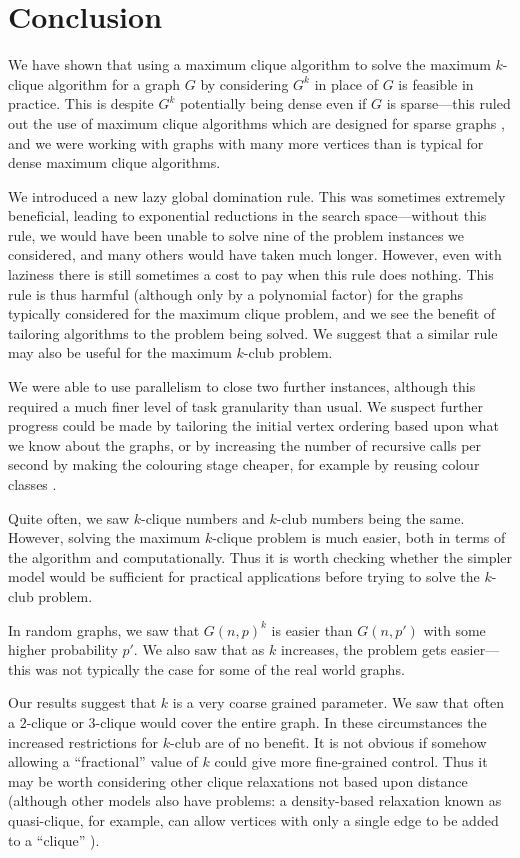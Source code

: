 \documentclass[letterpaper]{article}
\begin{document}
\section{Conclusion}

We have shown that using a maximum clique algorithm to solve the maximum $k$-clique algorithm for a
graph $G$ by considering $G^k$ in place of $G$ is feasible in practice. This is despite $G^k$
potentially being dense even if $G$ is sparse---this ruled out the use of maximum clique algorithms
which are designed for sparse graphs
\cite{DBLP:conf/waw/PattabiramanPGLC13,DBLP:journals/cor/SegundoLP16}, and we were working with
graphs with many more vertices than is typical for dense maximum clique algorithms.

We introduced a new lazy global domination rule. This was sometimes extremely beneficial, leading to
exponential reductions in the search space---without this rule, we would have been unable to solve
nine of the problem instances we considered, and many others would have taken much longer. However,
even with laziness there is still sometimes a cost to pay when this rule does nothing. This rule is
thus harmful (although only by a polynomial factor) for the graphs typically considered for the
maximum clique problem, and we see the benefit of tailoring algorithms to the problem being solved.
We suggest that a similar rule may also be useful for the maximum $k$-club problem.

We were able to use parallelism to close two further instances, although this required a much finer
level of task granularity than usual.  We suspect further progress could be made by tailoring the
initial vertex ordering based upon what we know about the graphs, or by increasing the number of
recursive calls per second by making the colouring stage cheaper, for example by reusing colour
classes \cite{DBLP:conf/lion/NikolaevBS15}.

Quite often, we saw $k$-clique numbers and $k$-club numbers being the same. However, solving the
maximum $k$-clique problem is much easier, both in terms of the algorithm and computationally. Thus
it is worth checking whether the simpler model would be sufficient for practical applications before
trying to solve the $k$-club problem.

In random graphs, we saw that $G(n, p)^k$ is easier than $G(n, p')$ with some higher probability
$p'$. We also saw that as $k$ increases, the problem gets easier---this was not typically the case
for some of the real world graphs.

Our results suggest that $k$ is a very coarse grained parameter. We saw that often a $2$-clique or
$3$-clique would cover the entire graph. In these circumstances the increased restrictions for
$k$-club are of no benefit. It is not obvious if somehow allowing a ``fractional'' value of $k$
could give more fine-grained control. Thus it may be worth considering other clique relaxations not
based upon distance (although other models also have problems: a density-based relaxation known as
quasi-clique, for example, can allow vertices with only a single edge to be added to a ``clique''
\cite{Abello:2002}).



\end{document}
